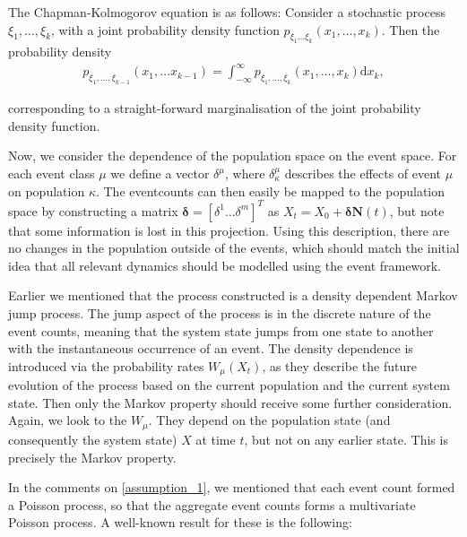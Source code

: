 \documentclass[10pt,a4paper]{article}
\begin{document}

The Chapman-Kolmogorov equation is as follows: Consider a stochastic process $\xi_1, \ldots, \xi_k$, with a joint probability density function $p_{\xi_1 \ldots \xi_k} \left( x_1, \ldots, x_k \right)$. Then the probability density
\begin{align*}
p_{\xi_1, \ldots, \xi_ {k-1}} \left( x_1, \ldots x_{k-1} \right) = \int_{-\infty}^\infty p_{\xi_1, \ldots, \xi_k}\left( x_1, \ldots, x_k \right) \mathrm{d} x_k,
\end{align*}

corresponding to a straight-forward marginalisation of the joint probability density function.

Now, we consider the dependence of the population space on the event space. For each event class $\mu$ we define a vector $\delta^\mu$, where $\delta^\mu_\kappa$ describes the effects of event $\mu$ on population $\kappa$. The eventcounts can then easily be mapped to the population space by constructing a matrix $\bm{\delta} = \left[ \delta^1 \ldots \delta^m \right]^{T}$ as $X_t = X_0 + \bm{\delta} \bm{N} \left( t \right)$, but note that some information is lost in this projection. Using this description, there are no changes in the population outside of the events, which should match the initial idea that all relevant dynamics should be modelled using the event framework.


Earlier we mentioned that the process constructed is a density dependent Markov jump process. The jump aspect of the process is in the discrete nature of the event counts, meaning that the system state jumps from one state to another with the instantaneous occurrence of an event. The density dependence is introduced via the probability rates $W_\mu \left( X_t\right)$, as they describe the future evolution of the process based on the current population and the current system state. Then only the Markov property should receive some further consideration. Again, we look to the $W_\mu$. They depend on the population state (and consequently the system state) $X$ at time $t$, but not on any earlier state. This is precisely the Markov property.

In the comments on \cref{assumption_1}, we mentioned that each event count formed a Poisson process, so that the aggregate event counts forms a multivariate Poisson process. A well-known result for these is the following:
\end{document}
